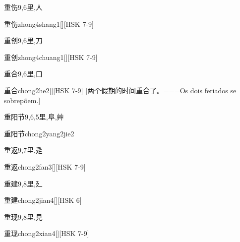 \begin{Entry}{重伤}{9,6}{⾥,⼈}
  \begin{Phonetics}{重伤}{zhong4shang1}[][HSK 7-9]
  \end{Phonetics}
\end{Entry}

\begin{Entry}{重创}{9,6}{⾥,⼑}
  \begin{Phonetics}{重创}{zhong4chuang1}[][HSK 7-9]
  \end{Phonetics}
\end{Entry}

\begin{Entry}{重合}{9,6}{⾥,⼝}
  \begin{Phonetics}{重合}{chong2he2}[][HSK 7-9]
    [两个假期的时间重合了。===Os dois feriados se sobrepõem.]
  \end{Phonetics}
\end{Entry}

\begin{Entry}{重阳节}{9,6,5}{⾥,⾩,⾋}
  \begin{Phonetics}{重阳节}{chong2yang2jie2}
  \end{Phonetics}
\end{Entry}

\begin{Entry}{重返}{9,7}{⾥,⾡}
  \begin{Phonetics}{重返}{chong2fan3}[][HSK 7-9]
  \end{Phonetics}
\end{Entry}

\begin{Entry}{重建}{9,8}{⾥,⼵}
  \begin{Phonetics}{重建}{chong2jian4}[][HSK 6]
  \end{Phonetics}
\end{Entry}

\begin{Entry}{重现}{9,8}{⾥,⾒}
  \begin{Phonetics}{重现}{chong2xian4}[][HSK 7-9]
  \end{Phonetics}
\end{Entry}

